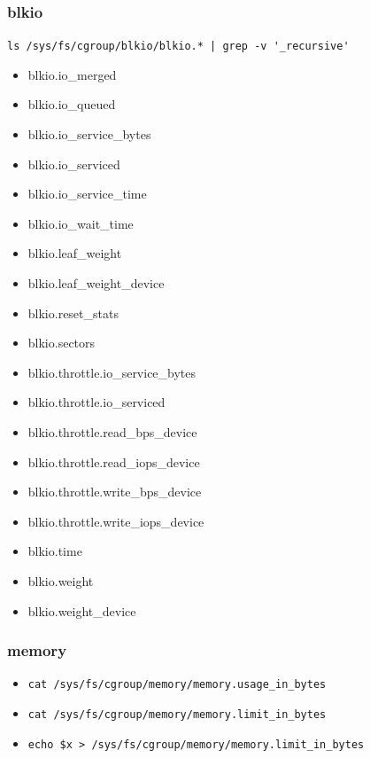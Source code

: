 \documentclass{beamer}
\begin{document}
\begin{frame}[fragile]
    \frametitle{blkio}
    \verb!ls /sys/fs/cgroup/blkio/blkio.* | grep -v '_recursive'!
    \begin{multicols}{2}
        \begin{itemize}
            \item blkio.io\_merged
            \item blkio.io\_queued
            \item blkio.io\_service\_bytes
            \item blkio.io\_serviced
            \item blkio.io\_service\_time
            \item blkio.io\_wait\_time
            \item blkio.leaf\_weight
            \item blkio.leaf\_weight\_device
            \item blkio.reset\_stats
            \item blkio.sectors
            \item blkio.throttle.io\_service\_bytes
            \item blkio.throttle.io\_serviced
            \item blkio.throttle.read\_bps\_device
            \item blkio.throttle.read\_iops\_device
            \item blkio.throttle.write\_bps\_device
            \item blkio.throttle.write\_iops\_device
            \item blkio.time
            \item blkio.weight
            \item blkio.weight\_device
        \end{itemize}
    \end{multicols}
\end{frame}

\begin{frame}[fragile]
    \frametitle{memory}
    \begin{itemize}
        \item \verb|cat /sys/fs/cgroup/memory/memory.usage_in_bytes|
        \item \verb|cat /sys/fs/cgroup/memory/memory.limit_in_bytes|
        \item \verb|echo $x > /sys/fs/cgroup/memory/memory.limit_in_bytes|
    \end{itemize}
\end{frame}
\end{document}
